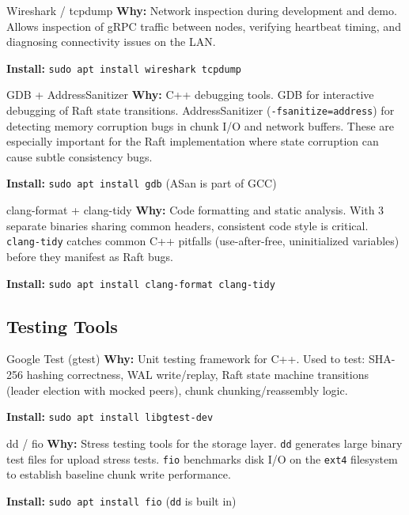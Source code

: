 \documentclass[12pt,a4paper]{article}
\begin{document}
\begin{toolbox}{Wireshark / tcpdump}
\textbf{Why:} Network inspection during development and demo. Allows inspection of gRPC traffic between nodes, verifying heartbeat timing, and diagnosing connectivity issues on the LAN.

\textbf{Install:} \texttt{sudo apt install wireshark tcpdump}
\end{toolbox}

\begin{toolbox}{GDB + AddressSanitizer}
\textbf{Why:} C++ debugging tools. GDB for interactive debugging of Raft state transitions. AddressSanitizer (\texttt{-fsanitize=address}) for detecting memory corruption bugs in chunk I/O and network buffers. These are especially important for the Raft implementation where state corruption can cause subtle consistency bugs.

\textbf{Install:} \texttt{sudo apt install gdb} (ASan is part of GCC)
\end{toolbox}

\begin{toolbox}{clang-format + clang-tidy}
\textbf{Why:} Code formatting and static analysis. With 3 separate binaries sharing common headers, consistent code style is critical. \texttt{clang-tidy} catches common C++ pitfalls (use-after-free, uninitialized variables) before they manifest as Raft bugs.

\textbf{Install:} \texttt{sudo apt install clang-format clang-tidy}
\end{toolbox}

\subsection{Testing Tools}

\begin{toolbox}{Google Test (gtest)}
\textbf{Why:} Unit testing framework for C++. Used to test: SHA-256 hashing correctness, WAL write/replay, Raft state machine transitions (leader election with mocked peers), chunk chunking/reassembly logic.

\textbf{Install:} \texttt{sudo apt install libgtest-dev}
\end{toolbox}

\begin{toolbox}{dd / fio}
\textbf{Why:} Stress testing tools for the storage layer. \texttt{dd} generates large binary test files for upload stress tests. \texttt{fio} benchmarks disk I/O on the \texttt{ext4} filesystem to establish baseline chunk write performance.

\textbf{Install:} \texttt{sudo apt install fio} (\texttt{dd} is built in)
\end{toolbox}
\end{document}
